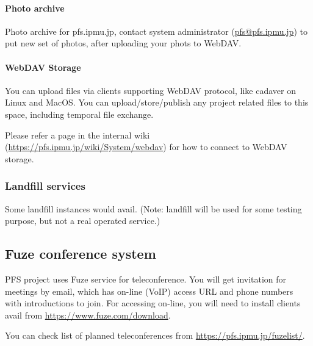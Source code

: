 \documentclass[a4paper,notitlepage]{article}
\begin{document}
\paragraph{Photo archive}

Photo archive for pfs.ipmu.jp, 
contact system administrator (\url{pfs@pfs.ipmu.jp}) to put new 
set of photos, after uploading your phots to WebDAV. 


\paragraph{WebDAV Storage}
\label{sec:pfs-webdav}

You can upload files via clients supporting WebDAV protocol, like cadaver on 
Linux and MacOS. 
You can upload/store/publish any project related files to this space, 
including temporal file exchange. 

Please refer a page in the internal wiki (\url{https://pfs.ipmu.jp/wiki/System/webdav}) 
for how to connect to WebDAV storage.

\subsubsection{Landfill services}

Some landfill instances would avail. 
(Note: landfill will be used for some testing purpose, but not a real 
operated service.) 


\subsection{Fuze conference system}
\label{sec:pfs-fuze}

PFS project uses Fuze service for teleconference. 
You will get invitation for meetings by email, which has on-line (VoIP) 
access URL and phone numbers with introductions to join. 
For accessing on-line, you will need to install clients avail from 
\url{https://www.fuze.com/download}. 

You can check list of planned teleconferences from 
\url{https://pfs.ipmu.jp/fuzelist/}. 
\end{document}

